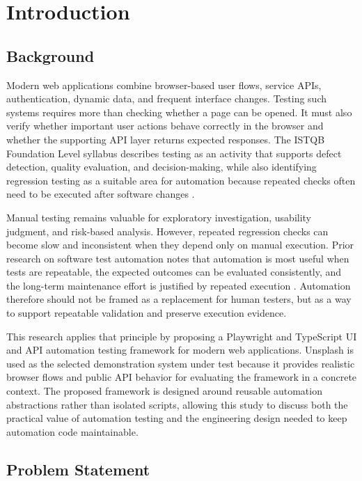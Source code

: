\chapter{Introduction}
\label{ch:introduction}

\section{Background}
\label{sec:ch1-background}

Modern web applications combine browser-based user flows, service APIs, authentication, dynamic data, and frequent interface changes. Testing such systems requires more than checking whether a page can be opened. It must also verify whether important user actions behave correctly in the browser and whether the supporting API layer returns expected responses. The ISTQB Foundation Level syllabus describes testing as an activity that supports defect detection, quality evaluation, and decision-making, while also identifying regression testing as a suitable area for automation because repeated checks often need to be executed after software changes \autocite{istqb_ctfl_syllabus_2024}.

Manual testing remains valuable for exploratory investigation, usability judgment, and risk-based analysis. However, repeated regression checks can become slow and inconsistent when they depend only on manual execution. Prior research on software test automation notes that automation is most useful when tests are repeatable, the expected outcomes can be evaluated consistently, and the long-term maintenance effort is justified by repeated execution \autocite{garousi_mantyla_automation_2016}. Automation therefore should not be framed as a replacement for human testers, but as a way to support repeatable validation and preserve execution evidence.

This research applies that principle by proposing a Playwright and TypeScript UI and API automation testing framework for modern web applications. Unsplash is used as the selected demonstration system under test because it provides realistic browser flows and public API behavior for evaluating the framework in a concrete context. The proposed framework is designed around reusable automation abstractions rather than isolated scripts, allowing this study to discuss both the practical value of automation testing and the engineering design needed to keep automation code maintainable.

\section{Problem Statement}
\label{sec:ch1-problem-statement}

